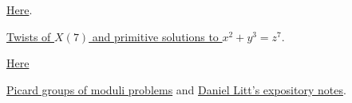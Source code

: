\documentclass[main.tex]{subfiles}
\begin{document}
\begin{example}
\href{https://mathoverflow.net/questions/3742/examples-of-algebraic-stacks-without-coarse-moduli-space?rq=1}{Here}.
\end{example}

\begin{example}[$x^{2}+y^{3}=z^{7}$]
\href{http://math.mit.edu/~poonen/papers/pss.pdf}{Twists of $X(7)$ and primitive solutions to $x^{2}+y^3=z^7$}.
\end{example}

\begin{example}
\href{https://mathoverflow.net/questions/24573/is-there-a-nice-proof-of-the-fact-that-there-are-p-1-24-supersingular-elliptic}{Here}
\end{example}
\begin{example}
\href{http://www.mathcs.emory.edu/~brussel/Scans/mumfordpicard.pdf}{Picard groups of moduli problems} and
\href{https://www.daniellitt.com/#/expository-notes/}{Daniel Litt's expository notes}.
\end{example}

\begin{example}
\end{example}
\end{document}
